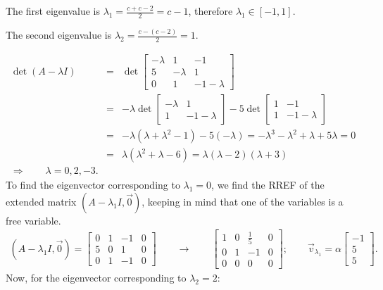 The first eigenvalue is $\lambda_1 = \frac{c+c-2}{2}=c-1$, therefore $\lambda_1\in[-1,1]$.

The second eigenvalue is $\lambda_2 = \frac{c-(c-2)}{2}=1$.

\vspace{2mm}
\begin{eqnarray*}
\det(A-\lambda I) &=& \det\left[\begin{array}{ccc}-\lambda&1&-1\\5&-\lambda&1\\0&1&-1-\lambda\end{array}\right]\\
&=&-\lambda\det\left[\begin{array}{cc}-\lambda&1\\1&-1-\lambda\end{array}\right]
-5\det\left[\begin{array}{cc}1&-1\\1&-1-\lambda\end{array}\right]\\
&=&-\lambda(\lambda+\lambda^2-1)-5(-\lambda)=-\lambda^3-\lambda^2+\lambda+5\lambda=0\\
&=&\lambda(\lambda^2+\lambda-6)=\lambda(\lambda-2)(\lambda+3)\\
\Rightarrow\qquad \lambda=0,2,-3.
\end{eqnarray*}
To find the eigenvector corresponding to $\lambda_1=0$, we find the RREF of the extended matrix $(A-\lambda_1 I,\vec{0})$, keeping in mind that one of the variables is a free variable.
\begin{eqnarray*}
  (A-\lambda_1 I,\vec{0})=\left[\begin{array}{ccc|c}0&1&-1&0\\5&0&1&0\\0&1&-1&0\end{array}\right]
	\qquad\rightarrow\qquad\left[\begin{array}{ccc|c}1&0&\frac{1}{5}&0\\0&1&-1&0\\0&0&0&0\end{array}\right];\qquad
	\vec{v}_{\lambda_1}=\alpha\left[\begin{array}{c}-1\\5\\5\end{array}\right].
\end{eqnarray*}
Now, for the eigenvector corresponding to $\lambda_2=2$:
